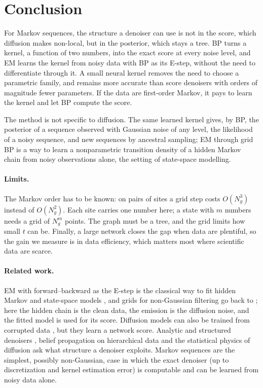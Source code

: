 \documentclass{article}
\begin{document}
\section{Conclusion}
\label{sec:conclusion}

For Markov sequences, the structure a denoiser can use is not in the score, which diffusion makes non-local, but in the
posterior, which stays a tree. BP turns a kernel, a function of two numbers, into the exact score at every noise level,
and EM learns the kernel from noisy data with BP as its E-step, without the need to differentiate through it. A small
neural kernel removes the need to choose a parametric family, and remains more accurate than score denoisers with orders
of magnitude fewer parameters. If the data are first-order Markov, it pays to learn the kernel and let BP compute the
score.

The method is not specific to diffusion. The same learned kernel gives, by BP, the posterior of a sequence observed with
Gaussian noise of any level, the likelihood of a noisy sequence, and new sequences by ancestral sampling; EM through grid
BP is a way to learn a nonparametric transition density of a hidden Markov chain from noisy observations alone, the
setting of state-space modelling.

\paragraph{Limits.} The Markov order has to be known: on pairs of sites a grid step costs $O(N_g^3)$ instead of
$O(N_g^2)$. Each site carries one number here; a state with $m$ numbers needs a grid of $N_g^m$ points. The graph must be
a tree, and the grid limits how small $t$ can be. Finally, a large network closes the gap when data are plentiful, so the
gain we measure is in data efficiency, which matters most where scientific data are scarce.

\paragraph{Related work.} EM with forward--backward as the E-step is the classical way to fit hidden Markov and
state-space models \cite{baum1970,rabiner1989tutorial,shumway1982em,cappe2005}, and grids for non-Gaussian filtering go
back to \cite{kitagawa1987}; here the hidden chain is the clean data, the emission is the diffusion noise, and the
fitted model is used for its score. Diffusion models can also be trained from corrupted data
\cite{daras2023ambient,rozet2024learning,bai2024em}, but they learn a network score. Analytic and structured denoisers
\cite{kamb2024analytic,kadkhodaie2024generalization}, belief propagation on hierarchical data
\cite{garnierbrun2024transformers,sclocchi2025phase,mei2024unets} and the statistical physics of diffusion
\cite{biroli2023generative,biroli2024dynamical,achilli2025memorization,bonnaire2025memorize,garnierbrun2026biased,garnierbrun2026foam}
ask what structure a denoiser exploits. Markov sequences are the simplest, possibly non-Gaussian, case in which the
exact denoiser (up to discretization and kernel estimation error) is computable and can be learned from noisy data alone.
\end{document}
